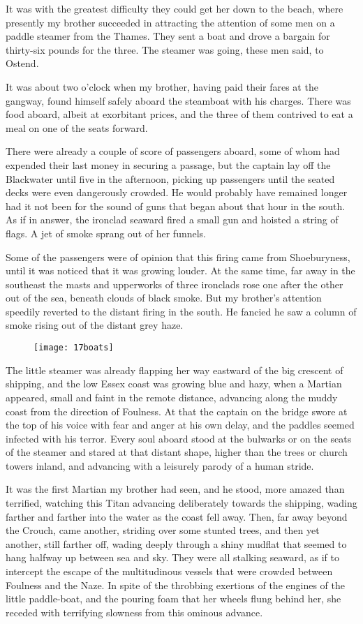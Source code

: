 It was with the greatest difficulty they could get her down to the beach, where presently my brother succeeded in attracting the attention of some men on a paddle steamer from the Thames. They sent a boat and drove a bargain for thirty-six pounds for the three. The steamer was going, these men said, to Ostend.

It was about two o'clock when my brother, having paid their fares at the gangway, found himself safely aboard the steamboat with his charges. There was food aboard, albeit at exorbitant prices, and the three of them contrived to eat a meal on one of the seats forward.

There were already a couple of score of passengers aboard, some of whom had expended their last money in securing a passage, but the captain lay off the Blackwater until five in the afternoon, picking up passengers until the seated decks were even dangerously crowded. He would probably have remained longer had it not been for the sound of guns that began about that hour in the south. As if in answer, the ironclad seaward fired a small gun and hoisted a string of flags. A jet of smoke sprang out of her funnels.

Some of the passengers were of opinion that this firing came from Shoeburyness, until it was noticed that it was growing louder. At the same time, far away in the southeast the masts and upperworks of three ironclads rose one after the other out of the sea, beneath clouds of black smoke. But my brother's attention speedily reverted to the distant firing in the south. He fancied he saw a column of smoke rising out of the distant grey haze.

\begin{figure}[tb!]
\centering
\texttt{[image: 17boats]}
\end{figure}

The little steamer was already flapping her way eastward of the big crescent of shipping, and the low Essex coast was growing blue and hazy, when a Martian appeared, small and faint in the remote distance, advancing along the muddy coast from the direction of Foulness. At that the captain on the bridge swore at the top of his voice with fear and anger at his own delay, and the paddles seemed infected with his terror. Every soul aboard stood at the bulwarks or on the seats of the steamer and stared at that distant shape, higher than the trees or church towers inland, and advancing with a leisurely parody of a human stride.

It was the first Martian my brother had seen, and he stood, more amazed than terrified, watching this Titan advancing deliberately towards the shipping, wading farther and farther into the water as the coast fell away. Then, far away beyond the Crouch, came another, striding over some stunted trees, and then yet another, still farther off, wading deeply through a shiny mudflat that seemed to hang halfway up between sea and sky. They were all stalking seaward, as if to intercept the escape of the multitudinous vessels that were crowded between Foulness and the Naze. In spite of the throbbing exertions of the engines of the little paddle-boat, and the pouring foam that her wheels flung behind her, she receded with terrifying slowness from this ominous advance.

